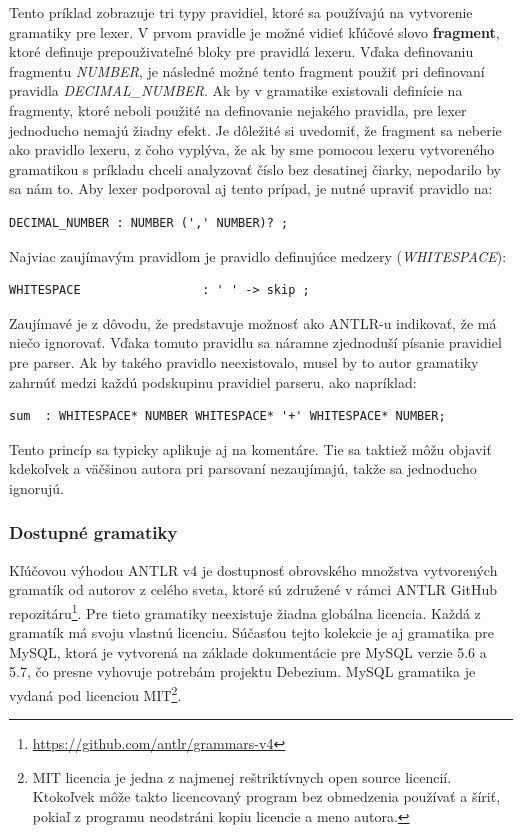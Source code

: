 Tento príklad zobrazuje tri typy pravidiel, ktoré sa používajú na vytvorenie gramatiky pre lexer. V prvom pravidle je možné vidieť kľúčové slovo \textbf{fragment}, ktoré definuje prepouživateľné bloky pre pravidlá lexeru. Vďaka definovaniu fragmentu \textit{NUMBER}, je následné možné tento fragment použiť pri definovaní pravidla \textit{DECIMAL\_NUMBER}. Ak by v gramatike existovali definície na fragmenty, ktoré neboli použité na definovanie nejakého pravidla, pre lexer jednoducho nemajú žiadny efekt. Je dôležité si uvedomiť, že fragment sa neberie ako pravidlo lexeru, z čoho vyplýva, že ak by sme pomocou lexeru vytvoreného gramatikou s príkladu chceli analyzovať číslo bez desatinej čiarky, nepodarilo by sa nám to. Aby lexer podporoval aj tento prípad, je nutné upraviť pravidlo na:

\begin{lstlisting}[basicstyle=\small]
DECIMAL_NUMBER : NUMBER (',' NUMBER)? ;
\end{lstlisting}

Najviac zaujímavým pravidlom je pravidlo definujúce medzery (\textit{WHITESPACE}):

\begin{lstlisting}[basicstyle=\small]
WHITESPACE                 : ' ' -> skip ;
\end{lstlisting}

Zaujímavé je z dôvodu, že predstavuje možnosť ako ANTLR-u indikovať, že má niečo ignorovať. Vďaka tomuto pravidlu sa náramne zjednoduší písanie pravidiel pre parser. Ak by takého pravidlo neexistovalo, musel by to autor gramatiky zahrnúť medzi každú podskupinu pravidiel parseru. ako napríklad:
\begin{lstlisting}[basicstyle=\small]
sum  : WHITESPACE* NUMBER WHITESPACE* '+' WHITESPACE* NUMBER;
\end{lstlisting}

Tento princíp sa typicky aplikuje aj na komentáre. Tie sa taktiež môžu objaviť kdekoľvek a väčšinou autora pri parsovaní nezaujímajú, takže sa jednoducho ignorujú.

\subsubsection{Dostupné gramatiky}
Kľúčovou výhodou ANTLR v4 je dostupnosť obrovského množstva vytvorených gramatík od autorov z celého sveta, ktoré sú združené v rámci ANTLR GitHub repozitáru\footnote{\url{https://github.com/antlr/grammars-v4}}. Pre tieto gramatiky neexistuje žiadna globálna licencia. Každá z gramatík má svoju vlastnú licenciu. Súčasťou tejto kolekcie je aj gramatika pre MySQL, ktorá je vytvorená na základe dokumentácie pre MySQL verzie 5.6 a 5.7, čo presne vyhovuje potrebám projektu Debezium. MySQL gramatika je vydaná pod licenciou MIT\footnote{MIT licencia je jedna z najmenej reštriktívnych open source licencií. Ktokoľvek môže takto licencovaný program bez obmedzenia používať a šíriť, pokiaľ z programu neodstráni kopiu licencie a meno autora.}.

